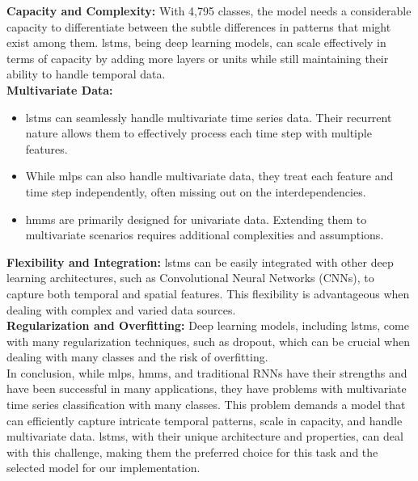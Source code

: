 \textbf{Capacity and Complexity:}
With 4,795 classes, the model needs a considerable capacity to differentiate between the subtle differences in patterns that might exist among them. 
\acp{lstm}, being deep learning models, can scale effectively in terms of capacity by adding more layers or units while still maintaining their ability to handle temporal data.\\

\textbf{Multivariate Data:}
\begin{itemize}
    \item \acp{lstm} can seamlessly handle multivariate time series data. Their recurrent nature allows them to effectively process each time step with multiple features.
    \item While \acp{mlp} can also handle multivariate data, they treat each feature and time step independently, often missing out on the interdependencies.
    \item \acp{hmm} are primarily designed for univariate data. Extending them to multivariate scenarios requires additional complexities and assumptions.
\end{itemize}

\textbf{Flexibility and Integration:}
\acp{lstm} can be easily integrated with other deep learning architectures, such as Convolutional Neural Networks (CNNs), to capture both temporal and spatial features. 
This flexibility is advantageous when dealing with complex and varied data sources.\\

\textbf{Regularization and Overfitting:}
Deep learning models, including \acp{lstm}, come with many regularization techniques, such as dropout, which can be crucial when dealing with many classes and the risk of overfitting.\\

In conclusion, while \acp{mlp}, \acp{hmm}, and traditional RNNs have their strengths and have been successful in many applications, they have problems with multivariate time series classification with many classes.
This problem demands a model that can efficiently capture intricate temporal patterns, scale in capacity, and handle multivariate data.
\acp{lstm}, with their unique architecture and properties, can deal with this challenge, making them the preferred choice for this task and the selected model for our implementation.

